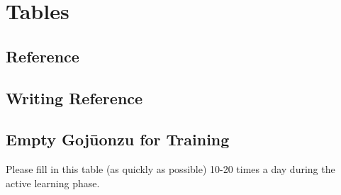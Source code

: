 \newcommand{\jTableKana}[2]{\jptab/#1#2}

\chapter{\jscript{} Tables}\label{chap:KanaTables}

\section{\jscript{} Reference}

\section{\jscript{} Writing Reference}



\newpage

\section{Empty Gojūonzu for Training}
\label{app:Leere50LauteTafel} Please fill in this table (as quickly as
possible) 10-20 times a day during the active learning phase.


